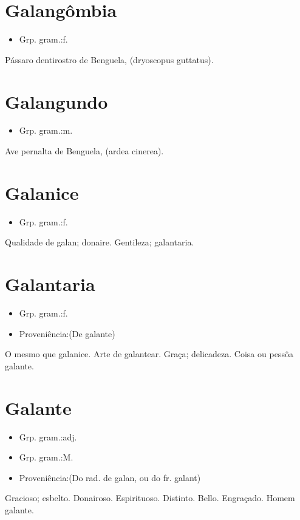 \section{Galangômbia}
\begin{itemize}
\item {Grp. gram.:f.}
\end{itemize}
Pássaro dentirostro de Benguela, (\textunderscore dryoscopus guttatus\textunderscore ).
\section{Galangundo}
\begin{itemize}
\item {Grp. gram.:m.}
\end{itemize}
Ave pernalta de Benguela, (\textunderscore ardea cinerea\textunderscore ).
\section{Galanice}
\begin{itemize}
\item {Grp. gram.:f.}
\end{itemize}
Qualidade de galan; donaire.
Gentileza; galantaria.
\section{Galantaria}
\begin{itemize}
\item {Grp. gram.:f.}
\end{itemize}
\begin{itemize}
\item {Proveniência:(De \textunderscore galante\textunderscore )}
\end{itemize}
O mesmo que \textunderscore galanice\textunderscore .
Arte de galantear.
Graça; delicadeza.
Coisa ou pessôa galante.
\section{Galante}
\begin{itemize}
\item {Grp. gram.:adj.}
\end{itemize}
\begin{itemize}
\item {Grp. gram.:M.}
\end{itemize}
\begin{itemize}
\item {Proveniência:(Do rad. de \textunderscore galan\textunderscore , ou do fr. \textunderscore galant\textunderscore )}
\end{itemize}
Gracioso; esbelto.
Donairoso.
Espirituoso.
Distinto.
Bello.
Engraçado.
Homem galante.
